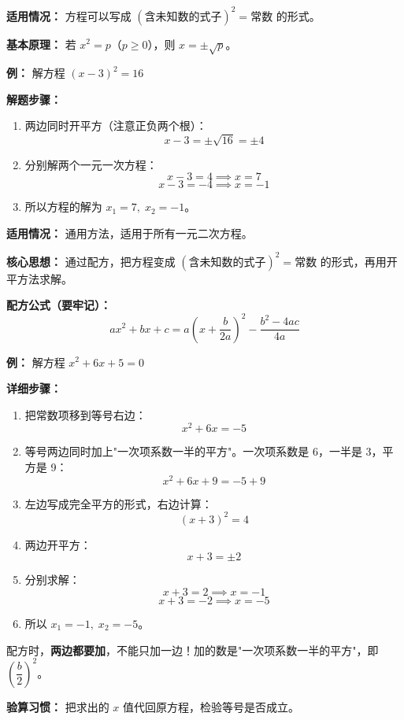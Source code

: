 \documentclass[12pt, a4paper]{ctexart}
\begin{document}
\begin{knowledgebox}
\textbf{适用情况：} 方程可以写成 $(\text{含未知数的式子})^2 = \text{常数}$ 的形式。

\textbf{基本原理：} 若 $x^2 = p$（$p \geq 0$），则 $x = \pm\sqrt{p}$。

\textbf{例：} 解方程 $(x - 3)^2 = 16$

\textbf{解题步骤：}
\begin{enumerate}[leftmargin=2em]
  \item 两边同时开平方（注意正负两个根）：
  \[
  x - 3 = \pm\sqrt{16} = \pm 4
  \]
  \item 分别解两个一元一次方程：
  \[
  x - 3 = 4 \implies x = 7
  \]
  \[
  x - 3 = -4 \implies x = -1
  \]
  \item 所以方程的解为 $x_1 = 7,\; x_2 = -1$。
\end{enumerate}
\end{knowledgebox}

\begin{knowledgebox}
\textbf{适用情况：} 通用方法，适用于所有一元二次方程。

\textbf{核心思想：} 通过配方，把方程变成 $(\text{含未知数的式子})^2 = \text{常数}$ 的形式，再用开平方法求解。

\textbf{配方公式（要牢记）：}
\[
ax^2 + bx + c = a\!\left(x + \frac{b}{2a}\right)^{\!2} - \frac{b^2 - 4ac}{4a}
\]

\textbf{例：} 解方程 $x^2 + 6x + 5 = 0$

\textbf{详细步骤：}
\begin{enumerate}[leftmargin=2em]
  \item 把常数项移到等号右边：
  \[
  x^2 + 6x = -5
  \]
  \item 等号两边同时加上"一次项系数一半的平方"。一次项系数是 6，一半是 3，平方是 9：
  \[
  x^2 + 6x + 9 = -5 + 9
  \]
  \item 左边写成完全平方的形式，右边计算：
  \[
  (x + 3)^2 = 4
  \]
  \item 两边开平方：
  \[
  x + 3 = \pm 2
  \]
  \item 分别求解：
  \[
  x + 3 = 2 \implies x = -1
  \]
  \[
  x + 3 = -2 \implies x = -5
  \]
  \item 所以 $x_1 = -1,\; x_2 = -5$。
\end{enumerate}
\end{knowledgebox}

\begin{warnbox}[配方法的关键步骤]
配方时，\textbf{两边都要加}，不能只加一边！加的数是"一次项系数一半的平方"，即 $\left(\dfrac{b}{2}\right)^2$。\vspace{4pt}

\textbf{验算习惯：} 把求出的 $x$ 值代回原方程，检验等号是否成立。
\end{warnbox}
\end{document}
